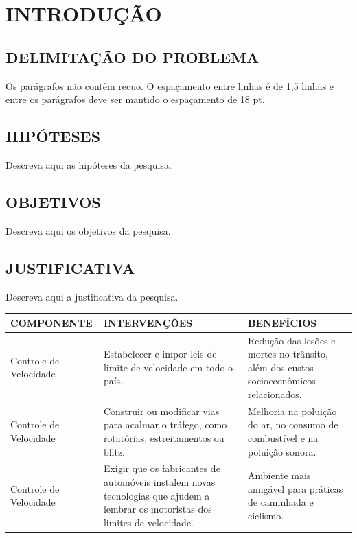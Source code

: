 \chapter{INTRODUÇÃO}
\label{introducao}
\label{capitulo1}

\section{DELIMITAÇÃO DO PROBLEMA}

Os parágrafos não contêm recuo. O espaçamento entre linhas é de 1,5 linhas e entre os parágrafos deve ser mantido o espaçamento de 18 pt.

\section{HIPÓTESES}

Descreva aqui as hipóteses da pesquisa.

\section{OBJETIVOS}

Descreva aqui os objetivos da pesquisa.

\section{JUSTIFICATIVA}

Descreva aqui a justificativa da pesquisa.

\begin{quadro}[htbp]
  \caption{Componentes relacionados à segurança viária, intervenções e benefícios}
  \label{quad:componentes}
  \centering
  \small
  \begin{tabular}{|p{3.5cm}|p{5cm}|p{5cm}|}
    \hline
    \textbf{COMPONENTE} & \textbf{INTERVENÇÕES} & \textbf{BENEFÍCIOS} \\
    \hline
    Controle de Velocidade & Estabelecer e impor leis de limite de velocidade em todo o país. & Redução das lesões e mortes no trânsito, além dos custos socioeconômicos relacionados. \\
    \hline
    Controle de Velocidade & Construir ou modificar vias para acalmar o tráfego, como rotatórias, estreitamentos ou blitz. & Melhoria na poluição do ar, no consumo de combustível e na poluição sonora. \\
    \hline
    Controle de Velocidade & Exigir que os fabricantes de automóveis instalem novas tecnologias que ajudem a lembrar os motoristas dos limites de velocidade. & Ambiente mais amigável para práticas de caminhada e ciclismo. \\
    \hline
  \end{tabular}
\end{quadro}

